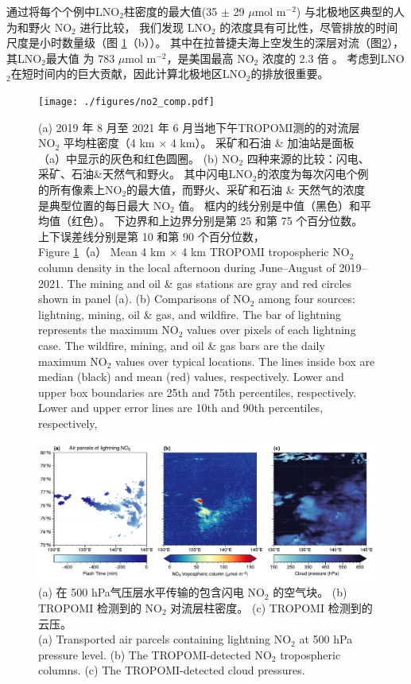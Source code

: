 通过将每个个例中LNO$_2$柱密度的最大值(35 $\pm$ 29 $\mu$mol m$^{-2}$) 与北极地区典型的人为和野火 NO$_2$ 进行比较，
我们发现 LNO$_2$ 的浓度具有可比性，尽管排放的时间尺度是小时数量级（图 \ref{fig:no2_comp}（b））。
其中在拉普捷夫海上空发生的深层对流（图\ref{fig:arctic_large_lno2}），
其LNO$_2$最大值 为 783 $\mu$mol m$^{-2}$，是美国最高 NO$_2$ 浓度的 2.3 倍 \citep{Goldberg.2021a}。
考虑到LNO$_2$在短时间内的巨大贡献，因此计算北极地区LNO$_2$的排放很重要。

\begin{figure}[htbp]
\centering
\texttt{[image: ./figures/no2\_comp.pdf]}
\caption{
(a) 2019 年 8 月至 2021 年 6 月当地下午TROPOMI测的的对流层 NO$_2$ 平均柱密度（4 km $\times$ 4 km）。
采矿和石油 \& 加油站是面板（a）中显示的灰色和红色圆圈。
(b) NO$_2$ 四种来源的比较：闪电、采矿、石油\&天然气和野火。
其中闪电LNO$_2$的浓度为每次闪电个例的所有像素上NO$_2$的最大值，而野火、采矿和石油 \& 天然气的浓度是典型位置的每日最大 NO$_2$ 值。
框内的线分别是中值（黑色）和平均值（红色）。
下边界和上边界分别是第 25 和第 75 个百分位数。
上下误差线分别是第 10 和第 90 个百分位数，\\
Figure \ref{fig:no2_comp}（a） Mean 4 km $\times$ 4 km TROPOMI tropospheric NO$_2$ column density in the local afternoon during June--August of 2019--2021.
The mining and oil \& gas stations are gray and red circles shown in panel (a).
(b) Comparisons of NO$_2$ among four sources: lightning, mining, oil \& gas, and wildfire.
The bar of lightning represents the maximum NO$_2$ values over pixels of each lightning case.
The wildfire, mining, and oil \& gas bars are the daily maximum NO$_2$ values over typical locations.
The lines inside box are median (black) and mean (red) values, respectively.
Lower and upper box boundaries are 25th and 75th percentiles, respectively.
Lower and upper error lines are 10th and 90th percentiles, respectively,
}
\label{fig:no2_comp}
\end{figure}

\begin{figure}[htbp]
\centering
\includegraphics[width=18cm]{./figures/arctic_large_lno2.pdf}
\caption{
(a) 在 500 hPa气压层水平传输的包含闪电 NO$_2$ 的空气块。
(b) TROPOMI 检测到的 NO$_2$ 对流层柱密度。
(c) TROPOMI 检测到的云压。\\
(a) Transported air parcels containing lightning NO$_2$ at 500 hPa pressure level.
(b) The TROPOMI-detected NO$_2$ tropospheric columns.
(c) The TROPOMI-detected cloud pressures.
}
\label{fig:arctic_large_lno2}
\end{figure}


